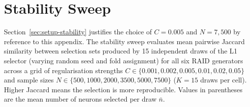 \documentclass[11pt]{article}
\begin{document}
\section{Stability Sweep}
\label{app:stability}

Section~\ref{sec:setup-stability} justifies the choice of $C=0.005$ and $N=7{,}500$ by reference to this appendix. The stability sweep evaluates mean pairwise Jaccard similarity between selection sets produced by 15 independent draws of the L1 selector (varying random seed and fold assignment) for all six RAID generators across a grid of regularisation strengths $C \in \{0.001, 0.002, 0.005, 0.01, 0.02, 0.05\}$ and sample sizes $N \in \{500, 1000, 2000, 3500, 5000, 7500\}$ ($K=15$ draws per cell). Higher Jaccard means the selection is more reproducible. Values in parentheses are the mean number of neurons selected per draw $\bar{n}$.
\end{document}
